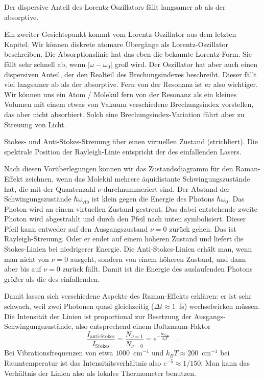 \begin{marginfigure}
\caption{Der dispersive Anteil des Lorentz-Oszillators fällt langsamer ab als der absorptive. }
\end{marginfigure}


Ein zweiter Gesichtspunkt kommt vom Lorentz-Oszillator aus dem letzten Kapitel. Wir können diskrete atomare Übergänge als Lorentz-Oszillator beschreiben. Die Absorptionslinie hat das eben die bekannte Lorentz-Form. Sie fällt sehr schnell ab, wenn $| \omega  - \omega_0 |$ groß wird. Der Oszillator hat aber auch einen dispersiven Anteil, der den Realteil des Brechungsindexes beschreibt. Dieser fällt viel langsamer ab als der absorptive. Fern von der Resonanz ist er also wichtiger. Wir können uns ein Atom / Molekül fern von der Resonanz als ein kleines Volumen mit einem etwas von Vakuum verschiedene Brechungsindex vorstellen, das aber nicht absorbiert. Solch eine Brechungsindex-Variation führt aber zu Streuung von Licht.

\begin{marginfigure}%
\caption{Stokes- und Anti-Stokes-Streuung über einen virtuellen Zustand (strichliert). Die spektrale Position der Rayleigh-Linie entspricht der des einfallenden Lasers.}
\end{marginfigure}
 

Nach diesen Vorüberlegungen können wir das Zustandsdiagramm für den Raman-Effekt zeichnen, wenn das Molekül mehrere äquidistante Schwingungszustände hat, die mit der Quantenzahl $\nu$ durchnummeriert sind. Der Abstand der Schwingungszustände $\hbar \omega_\text{vib}$ ist klein gegen die Energie des Photons $\hbar \omega_0$. Das Photon wird an einem virtuellen Zustand gestreut. Das dabei entstehende zweite Photon wird abgestrahlt und durch den Pfeil nach unten symbolisiert. Dieser Pfeil kann entweder auf den Ausgangszustand $\nu = 0$ zurück gehen. Das ist Rayleigh-Streuung. Oder er endet auf einem höheren Zustand und liefert die Stokes-Linien bei niedrigerer Energie. Die Anti-Stokes-Linien erhält man, wenn man nicht von $\nu = 0$ ausgeht, sondern von einem höheren Zustand, und dann aber bis auf $\nu = 0$ zurück fällt. Damit ist die Energie des auslaufenden Photons größer als die des einfallenden.



Damit lassen sich verschiedene Aspekte des Raman-Effekts erklären: er ist sehr schwach, weil zwei Photonen quasi gleichzeitig ($\Delta t \approx 1$~fs) wechselwirken müssen. Die Intensität der Linien ist proportional zur Besetzung der Ausgangs-Schwingungszustände, also entsprechend einem Boltzmann-Faktor
\begin{equation}
\frac{I_\text{anti-Stokes}}{I_\text{Stokes}} = 
\frac{N_{\nu = 1}}{N_{\nu = 0}} =
 e^{- \frac{\hbar \omega_\text{vib}}{k_b T}} \quad .
\end{equation}
Bei Vibrationsfrequenzen von etwa $1000$~cm$^{-1}$ und $k_B T \approx 200 $~cm$^{-1}$ bei Raumtemperatur ist das Intensitätsverhältnis also $e^{-5} \approx 1 /150$. Man kann das Verhältnis der Linien also als lokales Thermometer benutzen.

